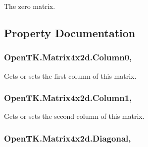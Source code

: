 The zero matrix. 



\subsection{Property Documentation}
\hypertarget{struct_open_t_k_1_1_matrix4x2d_ab679a61415960414727035131b646a57}{
\subsubsection[{Column0}]{ Open\-T\-K.\-Matrix4x2d.\-Column0\hspace{0.3cm}{\ttfamily [get]}, {\ttfamily [set]}}}\label{struct_open_t_k_1_1_matrix4x2d_ab679a61415960414727035131b646a57}


Gets or sets the first column of this matrix. 

\hypertarget{struct_open_t_k_1_1_matrix4x2d_a5ad56a89a41f5b62ec0ac162678f411a}{
\subsubsection[{Column1}]{ Open\-T\-K.\-Matrix4x2d.\-Column1\hspace{0.3cm}{\ttfamily [get]}, {\ttfamily [set]}}}\label{struct_open_t_k_1_1_matrix4x2d_a5ad56a89a41f5b62ec0ac162678f411a}


Gets or sets the second column of this matrix. 

\hypertarget{struct_open_t_k_1_1_matrix4x2d_a821c3d4f35d62cb5362c097d8dbefdbe}{
\subsubsection[{Diagonal}]{ Open\-T\-K.\-Matrix4x2d.\-Diagonal\hspace{0.3cm}{\ttfamily [get]}, {\ttfamily [set]}}}\label{struct_open_t_k_1_1_matrix4x2d_a821c3d4f35d62cb5362c097d8dbefdbe}


